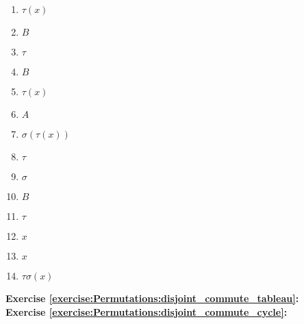 \begin{multicols}{5}
\begin{enumerate}
\item
$\tau(x)$

\item
$B$

\item
$\tau$

\item
$B$

\item
$\tau(x)$

\item
$A$

\item
$\sigma(\tau(x))$

\item
$\tau$

\item
$\sigma$

\item
$B$

\item
$\tau$

\item
$x$

\item
$x$

\item
%
$\tau\sigma(x)$
\end{enumerate}
\end{multicols}

\noindent\textbf{Exercise \ref{exercise:Permutations:disjoint_commute_tableau}:}\\

\noindent\textbf{Exercise \ref{exercise:Permutations:disjoint_commute_cycle}:}\\

